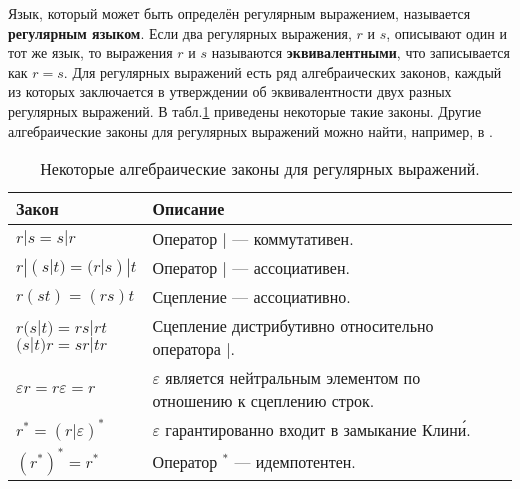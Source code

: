 \documentclass[10pt]{report}
\begin{document}
Язык, который может быть определён регулярным выражением, называется \textbf{регулярным языком}. Если два регулярных выражения, $r$ и $s$, описывают один и тот же язык, то
выражения $r$ и $s$ называются \textbf{эквивалентными}, что записывается как $r=s$. Для регулярных выражений есть ряд алгебраических законов, каждый из которых заключается в
утверждении об эквивалентности двух разных регулярных выражений. В табл.\ref{pp} приведены некоторые такие законы. Другие алгебраические законы для регулярных выражений
можно найти, например, в \cite{HopkroftMotvaniUllman}.
\begin{table}[!h]
\centering
\vspace{1mm}
\caption{Некоторые алгебраические законы для регулярных выражений.}\label{pp}
\begin{tabular}{|l|p{112mm}|}\hline
    Закон                                               & Описание                                                                     \\ \hline
    $r|s=s|r$                                           &  Оператор $|$ --- коммутативен.                                              \\ \hline
    $r|(s|t)=(r|s)|t$                                   &  Оператор $|$ --- ассоциативен.                                              \\ \hline
    $r(st)=(rs)t$                                       & Сцепление --- ассоциативно.                                                  \\ \hline
    {\parbox[t]{25mm}{$r(s|t)=rs|rt$\\ $(s|t)r=sr|tr$}} & Сцепление дистрибутивно относительно оператора $|$.                          \\ \hline
    $\varepsilon r=r\varepsilon=r$                      & $\varepsilon$ является нейтральным элементом по отношению к сцеплению строк. \\ \hline
    $r^*=(r|\varepsilon)^*$                             & $\varepsilon$ гарантированно входит в  замыкание Клин\'{и}.                  \\ \hline
    $(r^*)^*=r^*$                                       & Оператор ${}^*$ --- идемпотентен.                                            \\ \hline
\end{tabular}
\end{table}
\end{document}
